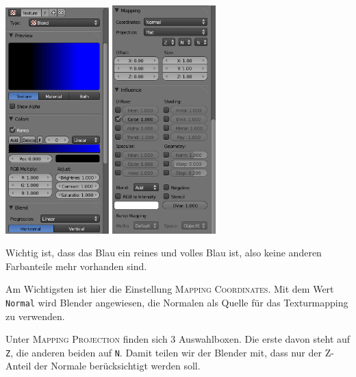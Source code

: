 \documentclass[a4paper]{article}
\newcommand{\ccaption}[1]{\textsc{#1}}
\newcommand{\cvalue}[1]{\texttt{#1}}
\newcommand{\rarrow}{\textrightarrow}
\begin{document}
\begin{center}
\includegraphics[width=40mm]{../images/blender/bumpmap-texture-1.png}
\includegraphics[width=40mm]{../images/blender/bumpmap-texture-2.png}
\end{center}

Wichtig ist, dass das Blau ein reines und volles Blau ist, also keine anderen Farbanteile mehr vorhanden sind.

Am Wichtigsten ist hier die Einstellung \ccaption{Mapping \rarrow Coordinates}. Mit dem Wert \cvalue{Normal} wird Blender angewiesen, die Normalen als
Quelle für das Texturmapping zu verwenden.

Unter \ccaption{Mapping \rarrow Projection} finden sich 3 Auswahlboxen. Die erste davon steht auf \cvalue{Z}, die anderen beiden auf \cvalue{N}. Damit
teilen wir der Blender mit, dass nur der Z-Anteil der Normale berücksichtigt werden soll.
\end{document}
